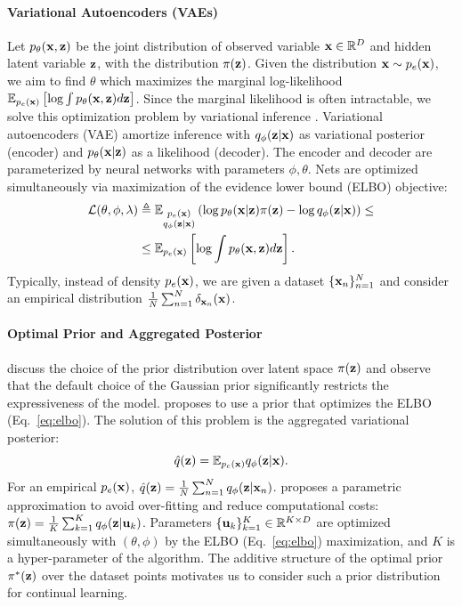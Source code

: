 \paragraph{Variational Autoencoders (VAEs)} Let $p_{\theta}({\mathbf{x}}, {\mathbf{z}})$ be the joint distribution of observed variable ${\mathbf{x}}\in\mathbb{R}^{D}$ and hidden latent variable ${\mathbf{z}}$, with the distribution $\pi({\mathbf{z}})$. Given the distribution ${\mathbf{x}}\sim p_{e}({\mathbf{x}})$, we aim to find $\theta$ which maximizes the marginal log-likelihood $ \mathbb{E}_{p_{e}({\mathbf{x}})}\left [\log \int p_{\theta}({\mathbf{x}}, {\mathbf{z}})d{\mathbf{z}}\right]$. Since the marginal likelihood is often intractable, we solve this optimization problem by variational inference \citep{jordan1999introduction}. Variational autoencoders (VAE) \citep{kingma2014autoencoding} amortize inference with $q_{\phi}({\mathbf{z}}|{\mathbf{x}})$ as variational posterior (encoder) and $p_{\theta}({\mathbf{x}}|{\mathbf{z}})$ as a likelihood (decoder). The encoder and decoder are parameterized by neural networks with parameters $\phi, \theta$. Nets are optimized simultaneously via maximization of the evidence lower bound (ELBO) objective:
\begin{equation}
\label{eq:elbo}
\begin{aligned}
    \mathcal{L}(\theta, \phi, \lambda) & \triangleq  \E_{\substack{p_{e}(\rvx)\\q_{\phi}(\rvz|\rvx)}}\left(\log p_{\theta}(\rvx|\rvz)\pi(\rvz) - \log q_{\phi}(\rvz|\rvx)\right) 
    \leq  \\
    & \leq  \E_{p_{e}(\rvx)}\left [\log \int p_{\theta}(\rvx, \rvz)d\rvz\right].
\end{aligned}
\end{equation}
Typically, instead of density $p_{e}({\mathbf{x}})$, we are given a dataset $\{{\mathbf{x}}_n\}_{n=1}^{N}$ and consider an empirical distribution $\tfrac{1}{N}\sum_{n=1}^{N}\delta_{{\mathbf{x}}_n}({\mathbf{x}})$.
\paragraph{Optimal Prior and Aggregated Posterior} \citet{hoffman2016elbo, goyal2017nonparametric} discuss the choice of the prior distribution over latent space $\pi({\mathbf{z}})$ and observe that the default choice of the Gaussian prior significantly restricts the expressiveness of the model. \citet{tomczak2018vae} proposes to use a prior that optimizes the ELBO (Eq.~\ref{eq:elbo}). The solution of this problem is the aggregated variational posterior:
\begin{equation}
\hat{q}({\mathbf{z}})=\mathbb{E}_{p_{e}({\mathbf{x}})}q_{\phi}({\mathbf{z}}|{\mathbf{x}}).
\end{equation}
For an empirical $p_e({\mathbf{x}})$, $\hat{q}({\mathbf{z}})=\tfrac{1}{N}\sum_{n=1}^{N}q_{\phi}({\mathbf{z}}|{\mathbf{x}}_n)$. \citet{tomczak2018vae} proposes a parametric approximation to avoid over-fitting and reduce computational costs: $\pi({\mathbf{z}}) = \frac{1}{K}\sum_{k=1}^{K}q_{\phi}({\mathbf{z}}|{\mathbf{u}}_k)$. 
Parameters $\{{\mathbf{u}}_k\}_{k=1}^{K}\in\mathbb{R}^{K\times D}$ are optimized simultaneously with $(\theta, \phi)$ by the ELBO (Eq.~\ref{eq:elbo}) maximization, and $K$ is a hyper-parameter of the algorithm. 
The additive structure of the optimal prior $\pi^{*}({\mathbf{z}})$ over the dataset points motivates us to consider such a prior distribution for continual learning.

